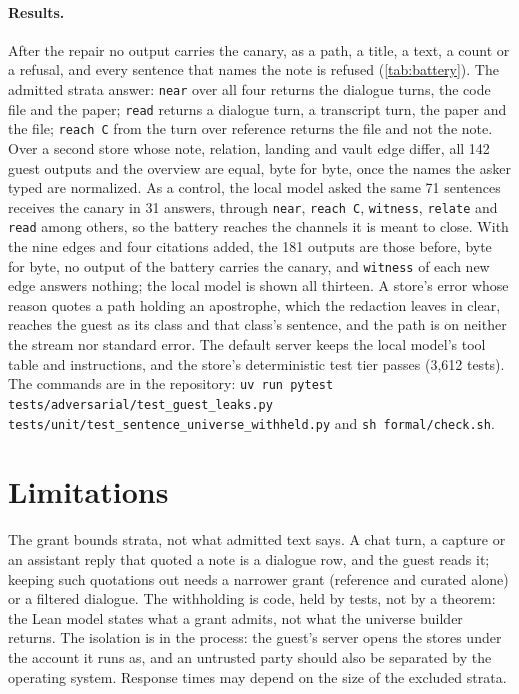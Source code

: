 \documentclass[11pt]{article}
\theoremstyle{plain}
\theoremstyle{definition}
\theoremstyle{remark}
\newcommand{\str}[1]{\textsf{#1}}
\begin{document}
\paragraph{Results.}
After the repair no output carries the canary, as a path, a title, a text, a count or a refusal,
and every sentence that names the note is refused (\cref{tab:battery}). The admitted strata
answer: \texttt{near} over all four returns the dialogue turns, the code file and the paper;
\texttt{read} returns a dialogue turn, a transcript turn, the paper and the file; \texttt{reach C}
from the turn over \str{reference} returns the file and not the note. Over a second store whose
note, relation, landing and vault edge differ, all 142 guest outputs and the overview are equal,
byte for byte, once the names the asker typed are normalized. As a control, the local model asked
the same 71 sentences receives the canary in 31 answers, through \texttt{near},
\texttt{reach C}, \texttt{witness}, \texttt{relate} and \texttt{read} among others, so the battery
reaches the channels it is meant to close. With the nine edges and four citations added, the 181
outputs are those before, byte for byte, no output of the battery carries the canary, and
\texttt{witness} of each new edge answers nothing; the local model is shown all thirteen. A
store's error whose reason quotes a path holding an apostrophe, which the redaction leaves in
clear, reaches the guest as its class and that class's sentence, and the path is on neither the
stream nor standard error. The default server keeps the local model's tool table and
instructions, and the store's deterministic test tier passes (3{,}612 tests). The commands are in
the repository: \texttt{uv run pytest tests/adversarial/test\_guest\_leaks.py
tests/unit/test\_sentence\_universe\_withheld.py} and \texttt{sh formal/check.sh}.

\section{Limitations}\label{sec:limits}

The grant bounds strata, not what admitted text says. A chat turn, a capture or an assistant reply
that quoted a note is a dialogue row, and the guest reads it; keeping such quotations out needs a
narrower grant (reference and curated alone) or a filtered dialogue. The withholding is code,
held by tests, not by a theorem: the Lean model states what a grant admits, not what the universe
builder returns. The isolation is in the process: the guest's server opens the stores under the
account it runs as, and an untrusted party should also be separated by the operating system.
Response times may depend on the size of the excluded strata.
\end{document}
